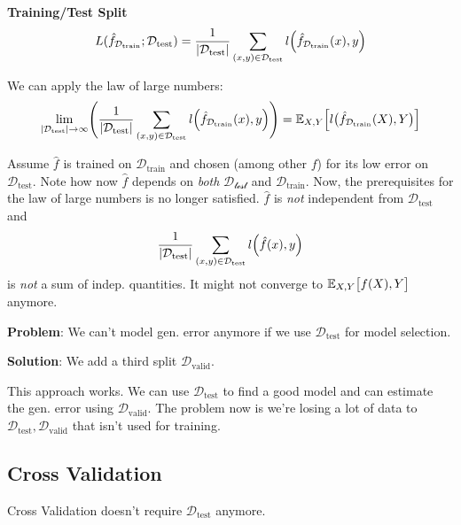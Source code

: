 \newpage

\method \textbf{Training/Test Split}\\
$$
    L(\hat{f}_{\mathcal{D}_\text{train}};\mathcal{D}_\text{test}) = \frac{1}{|\mathcal{D}_\text{test}|}\sum_{(x,y)\in\mathcal{D}_\text{test}} l\Bigl( \hat{f}_{\mathcal{D}_\text{train}}(x), y \Bigr)
$$

We can apply the law of large numbers:
{\footnotesize
$$
    \underset{|\mathcal{D}_\text{test}|\to\infty}{\lim}\Biggl( \frac{1}{|\mathcal{D}_\text{test}|}\sum_{(x,y)\in\mathcal{D}_\text{test}} l\Bigl( \hat{f}_{\mathcal{D}_\text{train}}(x), y \Bigr)\Biggr) = \mathbb{E}_{X,Y}\Bigl[ l\bigl( \hat{f}_{\mathcal{D}_\text{train}}(X),Y \bigr) \Bigr]
$$
}

{\footnotesize
    \remark Assume $\hat{f}$ is trained on $\mathcal{D}_\text{train}$ and chosen (among other $f$) for its low error on $\mathcal{D}_\text{test}$. Note how now $\hat{f}$ depends on \textit{both} $\mathcal{D_\text{test}}$ and $\mathcal{D}_\text{train}$. Now, the prerequisites for the law of large numbers is no longer satisfied. $\hat{f}$ is \textit{not} independent from $\mathcal{D}_\text{test}$ and
    $$
        \frac{1}{|\mathcal{D}_\text{test}|}\sum_{(x,y)\in\mathcal{D}_\text{test}} l\Bigl(\hat{f}(x),y\Bigr)
    $$
    is \textit{not} a sum of indep. quantities. It might not converge to $\mathbb{E}_{X,Y}\bigl[ f(X),Y \bigr]$ anymore.
}

\textbf{Problem}: We can't model gen. error anymore if we use $\mathcal{D}_\text{test}$ for model selection.

\textbf{Solution}: We add a third split $\mathcal{D}_\text{valid}$.

{\footnotesize  
    \remark This approach works. We can use $\mathcal{D}_\text{test}$ to find a good model and can estimate the gen. error using $\mathcal{D}_\text{valid}$. The problem now is we're losing a lot of data to $\mathcal{D}_\text{test}, \mathcal{D}_\text{valid}$ that isn't used for training.
}

\subsection{Cross Validation}

Cross Validation doesn't require $\mathcal{D}_\text{test}$ anymore.